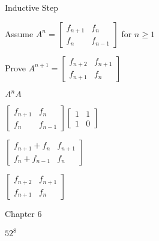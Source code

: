 \documentclass{exam}
\begin{document}
\begin{questions}
\begin{center}
Inductive Step

Assume 
\( A^n =
\begin{bmatrix}
f_{n+1} & f_{n}\\
f_{n} & f_{n-1}
\end{bmatrix}
\) for \(n \geq 1\)

Prove 
\( A^{n+1} =
\begin{bmatrix}
f_{n+2} & f_{n+1}\\
f_{n+1} & f_{n}
\end{bmatrix}
\)

\(A^{n} A\)

\(
\begin{bmatrix}
f_{n+1} & f_{n}\\
f_{n} & f_{n-1}
\end{bmatrix}
\begin{bmatrix}
1 & 1\\
1 & 0
\end{bmatrix}
\)

\(
\begin{bmatrix}
f_{n+1} + f_{n} & f_{n+1}\\
f_{n} + f_{n-1} & f_{n}
\end{bmatrix}
\)

\(
\begin{bmatrix}
f_{n+2} & f_{n+1}\\
f_{n+1} & f_{n}
\end{bmatrix}
\)

\end{center}

\newpage




\vspace{10pt}
{\Large Chapter 6}
\vspace{2pt}

\begin{subparts}

\begin{center}

\( 52^8 \)

\end{center}


\end{subparts}
\end{questions}
\end{document}
